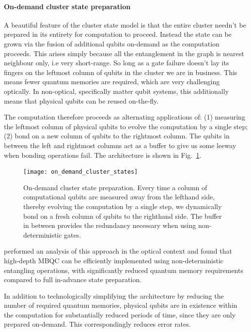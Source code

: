 %
%

\paragraph{On-demand cluster state preparation}

A beautiful feature of the cluster state model is that the entire cluster needn't be prepared in its entirety for computation to proceed. Instead the state can be grown via the fusion of additional qubits on-demand as the computation proceeds. This arises simply because all the entanglement in the graph is nearest neighbour only, i.e very short-range. So long as a gate failure doesn't lay its fingers on the leftmost column of qubits in the cluster we are in business. This means fewer quantum memories are required, which are very challenging optically. In non-optical, specifically matter qubit systems, this additionally means that physical qubits can be reused on-the-fly.

The computation therefore proceeds as alternating applications of: (1) measuring the leftmost column of physical qubits to evolve the computation by a single step; (2) bond on a new column of qubits to the rightmost column. The qubits in between the left and rightmost columns act as a buffer to give us some leeway when bonding operations fail. The architecture is shown in Fig.~\ref{fig:on_demand_cs}.

\begin{figure}[!htbp]
\texttt{[image: on\_demand\_cluster\_states]}
\captionspacefig \caption{On-demand cluster state preparation. Every time a column of computational qubits are measured away from the lefthand side, thereby evolving the computation by a single step, we dynamically bond on a fresh column of qubits to the righthand side. The buffer in between provides the redundancy necessary when using non-deterministic gates.}\label{fig:on_demand_cs}
\end{figure}

\cite{KokBuffer} performed an analysis of this approach in the optical context and found that high-depth MBQC can be efficiently implemented using non-deterministic entangling operations, with significantly reduced quantum memory requirements compared to full in-advance state preparation.

In addition to technologically simplifying the architecture by reducing the number of required quantum memories, physical qubits are in existence within the computation for substantially reduced periods of time, since they are only prepared on-demand. This correspondingly reduces error rates.


